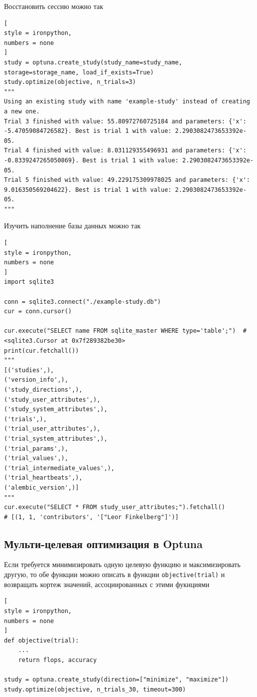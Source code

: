 \documentclass[%
	11pt,
	a4paper,
	utf8,
		]{article}
\begin{document}
Восстановить сессию можно так
\begin{lstlisting}[
style = ironpython,
numbers = none
]
study = optuna.create_study(study_name=study_name, storage=storage_name, load_if_exists=True)
study.optimize(objective, n_trials=3)
"""
Using an existing study with name 'example-study' instead of creating a new one.
Trial 3 finished with value: 55.80972760725184 and parameters: {'x': -5.47059084726582}. Best is trial 1 with value: 2.2903082473653392e-05.
Trial 4 finished with value: 8.031129355496931 and parameters: {'x': -0.8339247265050869}. Best is trial 1 with value: 2.2903082473653392e-05.
Trial 5 finished with value: 49.229175309978025 and parameters: {'x': 9.016350569204622}. Best is trial 1 with value: 2.2903082473653392e-05.
"""
\end{lstlisting}

Изучить наполнение базы данных можно так
\begin{lstlisting}[
style = ironpython,
numbers = none
]
import sqlite3

conn = sqlite3.connect("./example-study.db")
cur = conn.cursor()

cur.execute("SELECT name FROM sqlite_master WHERE type='table';")  # <sqlite3.Cursor at 0x7f289382be30>
print(cur.fetchall())
"""
[('studies',),
('version_info',),
('study_directions',),
('study_user_attributes',),
('study_system_attributes',),
('trials',),
('trial_user_attributes',),
('trial_system_attributes',),
('trial_params',),
('trial_values',),
('trial_intermediate_values',),
('trial_heartbeats',),
('alembic_version',)]
"""
cur.execute("SELECT * FROM study_user_attributes;").fetchall()
# [(1, 1, 'contributors', '["Leor Finkelberg"]')]
\end{lstlisting}

\subsection{Мульти-целевая оптимизация в Optuna}

Если требуется минимизировать одную целевую функцию и максимизировать другую, то обе функции можно описать в функции \verb|objective(trial)| и возвращать кортеж значений, ассоциированных с этими фукнциями
\begin{lstlisting}[
style = ironpython,
numbers = none
]
def objective(trial):
    ...
    return flops, accuracy
    
study = optuna.create_study(direction=["minimize", "maximize"])
study.optimize(objective, n_trials_30, timeout=300)
\end{lstlisting}
\end{document}
